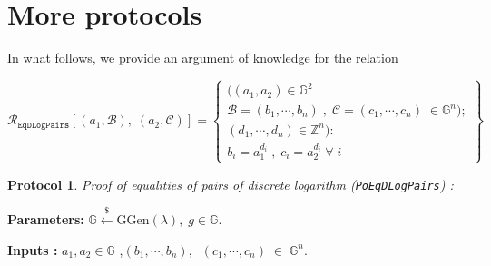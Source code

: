 \documentclass[11pt, lettersize, notitlepage, leqno, footskip=0.6cm]{article}
\newcommand{\ttt}{\texttt}
\newcommand{\bG}{\mathbb{G}}
\newcommand{\wti}{\widetilde}
\newcommand{\mc}{\mathcal}
\newcommand{\mb}{\mathbb}
\newcommand{\mbf}{\mathbf}
\newcommand{\mr}{\mathrm}
\newcommand{\lam}{\lambda}
\newcommand{\lamb}{\lambda}
\newcommand{\bO}{\mbf{O}}
\newcommand{\mP}{\mc{P}}
\newcommand{\V}{\mc{V}}
\newcommand{\mcM}{\mc{M}}
\newcommand{\vs}{\vspace{-0.15cm}}
\newcommand{\noin}{\noindent}
\newtheorem{Prot}[Thm]{Protocol}
\numberwithin{equation}{section}
\begin{document}
{\begin{comment}
\noin 8. $\mP$ computes $\wti{g}_0 := g^{\wti{e}}$ and sends $\wti{g}_0$ to $\V$ along with a non-interactive proof for \vs $$\ttt{PoGCD}[(g, \wti{A}),\;(g,g_1),\;(g,\wti{g}_0)].$$

\noin 9. $\mP$ generates a non-interactive proof for $\ttt{PoKE}[\wti{g}_0,\; g_2] .$ and sends it to $\V$.

\noin 10. $\V$ verifies all the proofs he receives and accepts if and only if they are all valid. \end{prf1}

\noin The proof consists of a constant number of $\bG$-elements and $\bO(n)$ $\lam$-bit integers. As was the case with the protocol for multiset intersections, the proof is simpler in special cases such as when the elements of every $\mcM_i$ are all primes $> 2^{\lam-1}$.


\end{comment}

\newpage

\appendix

\section{\fontsize{12}{12}\selectfont More protocols}

In what follows, we provide an argument of knowledge for the relation \vs

\[
  \mc{R}_{{\ttt{EqDLogPairs}}}[(a_1, \mc{B}),\; (a_2, \mc{C})] = \left\{\begin{array}{l}
  	((a_1, a_2)\in\mb{G}^2\\
    \mc{B} = (b_1,\cdots, b_n)\;,\;\mc{C} = (c_1,\cdots, c_n)\;\in\mb{G}^n);\\
    (d_1,\cdots,d_n)\in\mb{Z}^n): \\
    b_i = a_1^{d_i}\;,\;c_i = a_2^{d_i} \;\forall\;i
  \end{array}\right\}
\]

\vspace{0.2cm}


\begin{Prot} \normalfont \textit{Proof of equalities of pairs of discrete logarithm} (\verb|PoEqDLogPairs|) :\end{Prot} \vspace{-0.3cm}

\noindent \textbf{Parameters:} $\mb{G}\xleftarrow{\$} \mr{GGen}(\lamb), \; g\in \mb{G}$.

\noindent \textbf{Inputs :} $a_1,a_2\in\mb{G}$  \;,\;$(b_1,\cdots, b_n), \;\;(c_1,\cdots, c_n)\;\in\; \mb{G}^n$.

}
\end{document}
